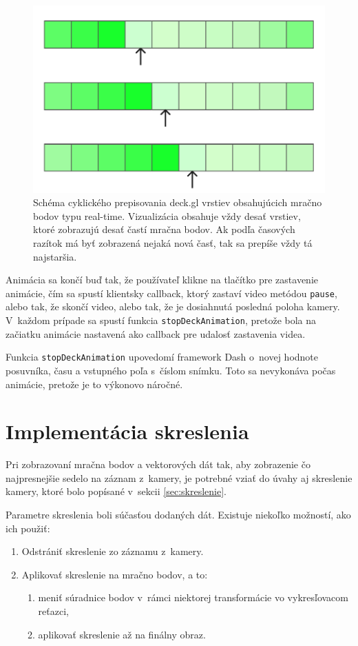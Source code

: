 \begin{figure}[t]
    \centering
    \includegraphics[width=0.4\linewidth]{text_prace/obrazky-figures/vrstvy_animacia.pdf}
    \caption[Schéma cyklického prepisovania deck.gl vrstiev obsahujúcich mračno bodov typu real-time.]{Schéma cyklického prepisovania deck.gl vrstiev obsahujúcich mračno bodov typu real-time. Vizualizácia obsahuje vždy desať vrstiev, ktoré zobrazujú desať častí mračna bodov. Ak podľa časových razítok má byť zobrazená nejaká nová časť, tak sa prepíše vždy tá najstaršia.}
    \label{fig:vrstvy_animacia}
\end{figure}

Animácia sa končí buď tak, že používateľ klikne na tlačítko pre zastavenie animácie, čím sa spustí klientsky callback, ktorý zastaví video metódou \texttt{pause}, alebo tak, že skončí video, alebo tak, že je dosiahnutá posledná poloha kamery. V~každom prípade sa spustí funkcia \texttt{stopDeckAnimation}, pretože bola na začiatku animácie nastavená ako callback pre udalosť zastavenia videa.

Funkcia \texttt{stopDeckAnimation} upovedomí framework Dash o~novej hodnote posuvníka, času a vstupného poľa s~číslom snímku. Toto sa nevykonáva počas animácie, pretože je to výkonovo náročné.

\section{Implementácia skreslenia}
\label{sec:implementacia_skreslenia}

Pri zobrazovaní mračna bodov a vektorových dát tak, aby zobrazenie čo najpresnejšie sedelo na záznam z~kamery, je potrebné vziať do úvahy aj skreslenie kamery, ktoré bolo popísané v~sekcii \ref{sec:skreslenie}. 

Parametre skreslenia boli súčasťou dodaných dát. Existuje niekoľko možností, ako ich použiť:
\begin{enumerate}
    \item Odstrániť skreslenie zo záznamu z~kamery.
    \item Aplikovať skreslenie na mračno bodov, a to:
    \begin{enumerate}
        \item meniť súradnice bodov v~rámci niektorej transformácie vo vykresľovacom reťazci,
        \item aplikovať skreslenie až na finálny obraz.
    \end{enumerate}
\end{enumerate}

